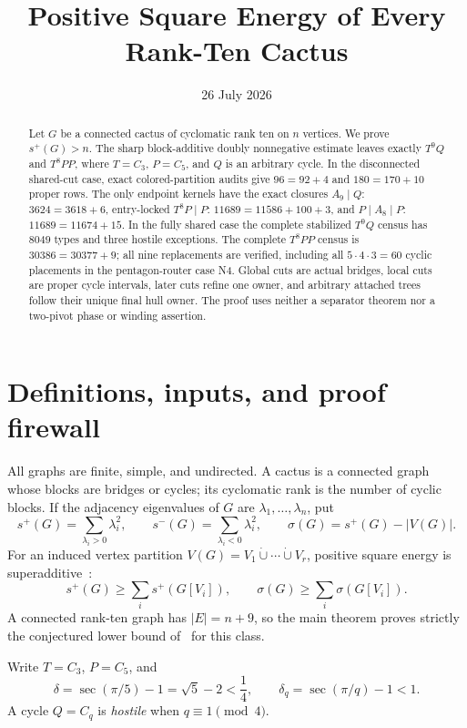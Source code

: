 \documentclass[11pt]{article}
\title{Positive Square Energy of Every Rank-Ten Cactus}
\author{}
\date{26 July 2026}
\newcommand{\spE}{s^+}
\newcommand{\smE}{s^-}
\newcommand{\sig}{\sigma}
\begin{document}
\maketitle

\begin{abstract}
Let $G$ be a connected cactus of cyclomatic rank ten on $n$ vertices.  We
prove $s^+(G)>n$.  The sharp block-additive doubly nonnegative estimate leaves
exactly $T^9Q$ and $T^8PP$, where $T=C_3$, $P=C_5$, and $Q$ is an arbitrary
cycle.  In the disconnected shared-cut case, exact colored-partition audits
give $96=92+4$ and $180=170+10$ proper rows.  The only endpoint kernels have
the exact closures $A_9\mid Q$: $3624=3618+6$, entry-locked
$T^8P\mid P$: $11689=11586+100+3$, and $P\mid A_8\mid P$:
$11689=11674+15$.  In the fully shared case the complete stabilized $T^9Q$
census has $8049$ types and three hostile exceptions.  The complete $T^8PP$
census is $30386=30377+9$; all nine replacements are verified, including all
$5\cdot4\cdot3=60$ cyclic placements in the pentagon-router case N4.  Global
cuts are actual bridges, local cuts are proper cycle intervals, later cuts
refine one owner, and arbitrary attached trees follow their unique final hull
owner.  The proof uses neither a separator theorem nor a two-pivot phase or
winding assertion.
\end{abstract}

\section{Definitions, inputs, and proof firewall}

All graphs are finite, simple, and undirected.  A cactus is a connected graph
whose blocks are bridges or cycles; its cyclomatic rank is the number of cyclic
blocks.  If the adjacency eigenvalues of $G$ are
$\lambda_1,\ldots,\lambda_n$, put
\[
 \spE(G)=\sum_{\lambda_i>0}\lambda_i^2,
 \qquad \smE(G)=\sum_{\lambda_i<0}\lambda_i^2,
 \qquad \sig(G)=\spE(G)-|V(G)|.
\]
For an induced vertex partition
$V(G)=V_1\mathbin{\dot\cup}\cdots\mathbin{\dot\cup}V_r$, positive square
energy is superadditive~\cite{AKMP}:
\begin{equation}\label{eq:super}
 \spE(G)\geq\sum_i\spE(G[V_i]),
 \qquad \sig(G)\geq\sum_i\sig(G[V_i]).
\end{equation}
A connected rank-ten graph has $|E|=n+9$, so the main theorem proves strictly
the conjectured lower bound of~\cite{AKMPZ} for this class.

Write $T=C_3$, $P=C_5$, and
\[
 \delta=\sec(\pi/5)-1=\sqrt5-2<\frac14,
 \qquad \delta_q=\sec(\pi/q)-1<1.
\]
A cycle $Q=C_q$ is \emph{hostile} when $q\equiv1\pmod4$.
\end{document}

